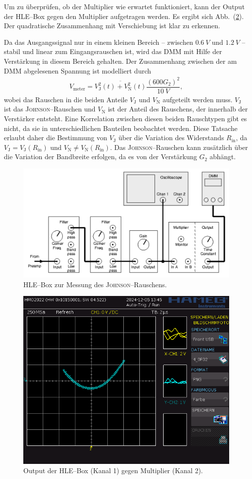 \documentclass[sn-mathphys-num,iicol]{sn-jnl}
\theoremstyle{thmstyleone}
\theoremstyle{thmstyletwo}
\theoremstyle{thmstylethree}
\begin{document}
Um zu überprüfen, ob der Multiplier wie erwartet funktioniert, kann der Output der HLE--Box gegen den Multiplier aufgetragen werden.
Es ergibt sich Abb.\ (\ref{fig:multiplier}).
Der quadratische Zusammenhang mit Verschiebung ist klar zu erkennen. %

Da das Ausgangssignal nur in einem kleinen Bereich -- zwischen $\SI{0.6}{V}$ und $\SI{1.2}{V}$ -- stabil und linear zum Eingangsrauschen ist, wird das DMM mit Hilfe der Verstärkung in diesem Bereich gehalten.
Der Zusammenhang zwischen der am DMM abgelesenen Spannung ist modelliert durch
\begin{align}
	V_\text{meter}=\overline{V_\text{J}^2(t)+V_\text{N}^2(t)}\dfrac{\left(600G_2\right)^2}{\SI{10}{V}}
	,\end{align}
wobei das Rauschen in die beiden Anteile $V_\text{J}$ und $V_\text{N}$ aufgeteilt werden muss.
$V_\text{J}$ ist das \textsc{Johnson}--Rauschen und $V_\text{N}$ ist der Anteil des Rauschens, der innerhalb der Verstärker entsteht.
Eine Korrelation zwischen diesen beiden Rauschtypen gibt es nicht, da sie in unterschiedlichen Bauteilen beobachtet werden. %
Diese Tatsache erlaubt daher die Bestimmung von $V_\text{J}$ über die Variation des Widerstands $R_\text{in}$, da $V_\text{J}=V_\text{J}(R_\text{in})$ und $V_\text{N}\neq V_\text{N}(R_\text{in})$.
Das \textsc{Johnson}--Rauschen kann zusätzlich über die Variation der Bandbreite erfolgen, da es von der Verstärkung $G_2$ abhängt.

\begin{figure}[t]
	\centering
	\includegraphics[width=.5\textwidth]{425_schaltplan_messung_johnson.png}
	\caption{HLE--Box zur Messung des \textsc{Johnson}--Rauschens.\cite{anleitung425}} \label{fig:johnson_hle_messung}
\end{figure}

\begin{figure}[t]
	\centering
	\includegraphics[width=.5\textwidth]{../data/4_0F02.png}
	\caption{Output der HLE--Box (Kanal 1) gegen Multiplier (Kanal 2).} \label{fig:multiplier}
\end{figure}
\end{document}

